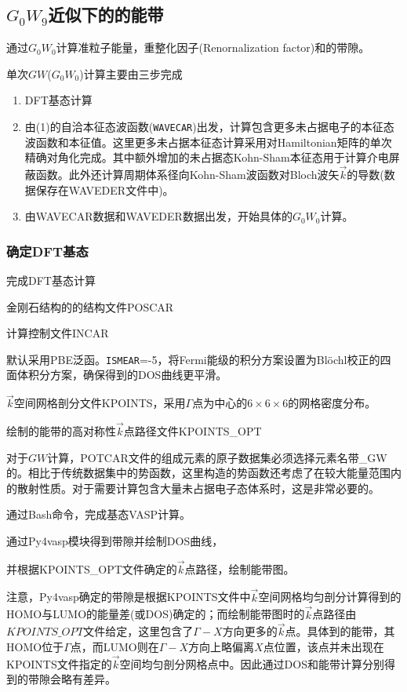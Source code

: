 \subsection{$G_0W_9$近似下的的能带}
通过$G_0W_0$计算准粒子能量，重整化因子\textrm{(Renornalization factor)}和的带隙。

单次$GW$($G_0W_0$)计算主要由三步完成
\begin{enumerate}
	\item \textrm{DFT}基态计算
	\item 由(1)的自洽本征态波函数(\texttt{WAVECAR})出发，计算包含更多未占据电子的本征态波函数和本征值。这里更多未占据本征态计算采用对\textrm{Hamiltonian}矩阵的单次精确对角化完成。其中额外增加的未占据态\textrm{Kohn-Sham}本征态用于计算介电屏蔽函数。此外还计算周期体系径向\textrm{Kohn-Sham}波函数对\textrm{Bloch}波矢$\vec k$的导数(数据保存在\textrm{WAVEDER}文件中)。
	\item 由\textrm{WAVECAR}数据和\textrm{WAVEDER}数据出发，开始具体的$G_0W_0$计算。
\end{enumerate}

\subsubsection{确定\rm{DFT}基态}
完成\textrm{DFT}基态计算

金刚石结构的的结构文件\textrm{POSCAR}

计算控制文件\textrm{INCAR}

默认采用\textrm{PBE}泛函。\texttt{ISMEAR}=-5，将\textrm{Fermi}能级的积分方案设置为\textrm{Bl\"ochl}校正的四面体积分方案，确保得到的\textrm{DOS}曲线更平滑。

$\vec k$空间网格剖分文件\textrm{KPOINTS}，采用$\Gamma$点为中心的$6\times6\times6$的网格密度分布。

绘制的能带的高对称性$\vec k$点路径文件\textrm{KPOINTS\_OPT}

对于$GW$计算，\textrm{POTCAR}文件的组成元素的原子数据集必须选择元素名带\textrm{\_GW}的。相比于传统数据集中的势函数，这里构造的势函数还考虑了在较大能量范围内的散射性质。对于需要计算包含大量未占据电子态体系时，这是非常必要的。

通过\textrm{Bash}命令，完成基态\textrm{VASP}计算。

通过\textrm{Py4vasp}模块得到带隙并绘制\textrm{DOS}曲线，

并根据\textrm{KPOINTS\_OPT}文件确定的$\vec k$点路径，绘制能带图。

注意，\textrm{Py4vasp}确定的带隙是根据\textrm{KPOINTS}文件中$\vec k$空间网格均匀剖分计算得到的\textrm{HOMO}与\textrm{LUMO}的能量差(或\textrm{DOS})确定的；而绘制能带图时的$\vec k$点路径由$KPOINTS\_OPT$文件给定，这里包含了$\Gamma-X$方向更多的$\vec k$点。具体到的能带，其\textrm{HOMO}位于$\Gamma$点，而\textrm{LUMO}则在$\Gamma-X$方向上略偏离$X$点位置，该点并未出现在\textrm{KPOINTS}文件指定的$\vec k$空间均匀剖分网格点中。因此通过\textrm{DOS}和能带计算分别得到的带隙会略有差异。

